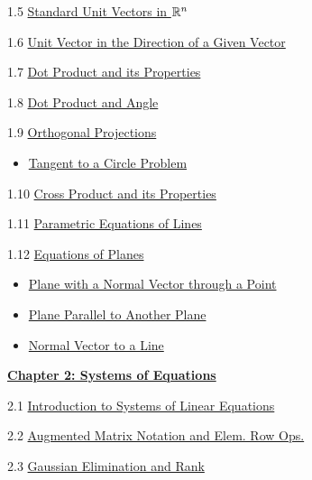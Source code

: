 \documentclass{ximera}
\begin{document}
1.5	\href{https://ximera.osu.edu/linearalgebradzv3/LinearAlgebraInteractiveIntro/VEC-0035/main}{Standard Unit Vectors in $\mathbb{R}^n$}

1.6	\href{https://ximera.osu.edu/linearalgebradzv3/LinearAlgebraInteractiveIntro/VEC-0036/main}{Unit Vector in the Direction of a Given Vector}
	
1.7	\href{https://ximera.osu.edu/linearalgebradzv3/LinearAlgebraInteractiveIntro/VEC-0050/main}{Dot Product and its Properties}
	
1.8	\href{https://ximera.osu.edu/linearalgebradzv3/LinearAlgebraInteractiveIntro/VEC-0060/main}{Dot Product and Angle }
	
1.9	\href{https://ximera.osu.edu/linearalgebradzv3/LinearAlgebraInteractiveIntro/VEC-0070/main}{Orthogonal Projections}
\begin{itemize}
    \item 
    \href{https://www.geogebra.org/m/bngnjxee}{Tangent to a Circle Problem}
\end{itemize}
	
1.10	\href{https://ximera.osu.edu/linearalgebradzv3/LinearAlgebraInteractiveIntro/VEC-0080/main}{Cross Product and its Properties}
	
1.11	\href{https://ximera.osu.edu/linearalgebradzv3/LinearAlgebraInteractiveIntro/RRN-0020/main}{Parametric Equations of Lines}
	
1.12	\href{https://ximera.osu.edu/linearalgebradzv3/LinearAlgebraInteractiveIntro/RRN-0030/main}{Equations of Planes}
\begin{itemize}
\item
\href{https://www.geogebra.org/m/gsaag2dx}{Plane with a Normal Vector through a Point}
\item
\href{https://www.geogebra.org/m/unceva9g}{Plane Parallel to Another Plane}
\item
\href{https://www.geogebra.org/m/tg2duwqk}{Normal Vector to a Line}
\end{itemize}	
\href{https://ximera.osu.edu/linearalgebradzv3/LinearAlgebraInteractiveIntro/XLAChapter_systems/main}{\textbf{Chapter 2: Systems of Equations}}
	
2.1	\href{https://ximera.osu.edu/linearalgebradzv3/LinearAlgebraInteractiveIntro/SYS-0020/main}{Introduction to Systems of Linear Equations}
	
2.2	\href{https://ximera.osu.edu/linearalgebradzv3/LinearAlgebraInteractiveIntro/SYS-0030/main}{Augmented Matrix Notation and Elem. Row Ops.}
	
2.3	\href{https://ximera.osu.edu/linearalgebradzv3/LinearAlgebraInteractiveIntro/SYS-0030/main}{Gaussian Elimination and Rank}
	
\end{document}
